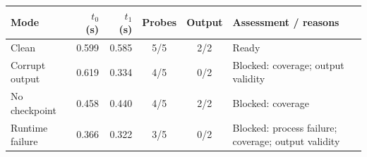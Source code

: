 \begin{tabularx}{\textwidth}{lrrccY}
\toprule Mode & $t_0$ (s) & $t_1$ (s) & Probes & Output & Assessment / reasons \\
\midrule
Clean & 0.599 & 0.585 & 5/5 & 2/2 & Ready \\
Corrupt output & 0.619 & 0.334 & 4/5 & 0/2 & Blocked: coverage; output validity \\
No checkpoint & 0.458 & 0.440 & 4/5 & 2/2 & Blocked: coverage \\
Runtime failure & 0.366 & 0.322 & 3/5 & 0/2 & Blocked: process failure; coverage; output validity \\
\bottomrule
\end{tabularx}
